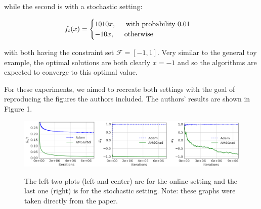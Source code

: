 \documentclass[letterpaper, 10 pt, conference]{ieeeconf}  %
\begin{document}
while the second is with a stochastic setting:

\[
    f_{t}(x) = 
    \begin{cases}
     	1010x, \hspace{5mm} \text{with probability 0.01}\\
        -10x, \hspace{5mm} \text{otherwise}
    \end{cases}
\]

with both having the constraint set $\mathcal{F} = [-1, 1]$. Very similar to the general toy example, the optimal solutions are both clearly $x = -1$ and so the algorithms are expected to converge to this optimal value. \par
For these experiments, we aimed to recreate both settings with the goal of reproducing the figures the authors included. The authors' results are shown in Figure 1. 

\begin{figure}[]
\centering
\begin{minipage}{0.9\textwidth}
  \centering
  \includegraphics[width=1\linewidth]{OG_Results_synth.png}
  \label{fig:test1}
\end{minipage}%
\caption[]{The left two plots (left and center) are for the online setting and the last one (right) is for the stochastic setting. Note: these graphs were taken directly from the paper.}
\end{figure}
\end{document}
